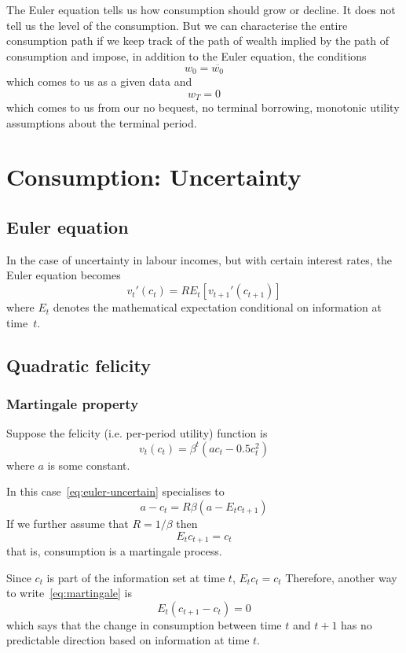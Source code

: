 \documentclass[12pt,reqno,openany]{amsbook}
\theoremstyle{plain}
\theoremstyle{definition}
\begin{document}
The Euler equation tells us how consumption should grow or decline. It
does not tell us the level of the consumption. But we can characterise
the entire consumption path if we keep track of
the path of wealth implied by the path of consumption and impose, in
addition to the Euler equation, the
conditions
\[w_0 = \overline{w_0}\]
which comes to us as a given data and 
\[w_T=0\]
which comes to us from our no bequest, no terminal borrowing,
monotonic utility assumptions about the terminal period.

\chapter{Consumption: Uncertainty}
\section{Euler equation}
In the case of uncertainty in labour incomes, but with certain
interest rates, the Euler equation becomes
\begin{equation}\label{eq:euler-uncertain}
v_t'(c_t)=RE_t[v_{t+1}'(c_{t+1})]
\end{equation}
where $E_t$ denotes the mathematical expectation conditional on information at time~$t$.

\section{Quadratic felicity}
\subsection{Martingale property}
Suppose the felicity (i.e. per-period utility) function is
\[v_t(c_t)=\beta^t(ac_t-0.5c_t^2)\]
where $a$ is some constant.

In this case~\eqref{eq:euler-uncertain} specialises to
\[a-c_t = R\beta(a- E_t c_{t+1})\]
If we further assume that $R=1/\beta$ then
\begin{equation}\label{eq:martingale}
E_t c_{t+1}=c_t
\end{equation}
that is, consumption is a martingale process. 

Since $c_t$ is part of the information set at time $t$, $E_tc_t=c_t$
Therefore, another way to write~\eqref{eq:martingale} is
\[E_t(c_{t+1}-c_t)=0\]
which says that the change in consumption between time $t$ and $t+1$
has no predictable direction based on information at time $t$.
\end{document}
